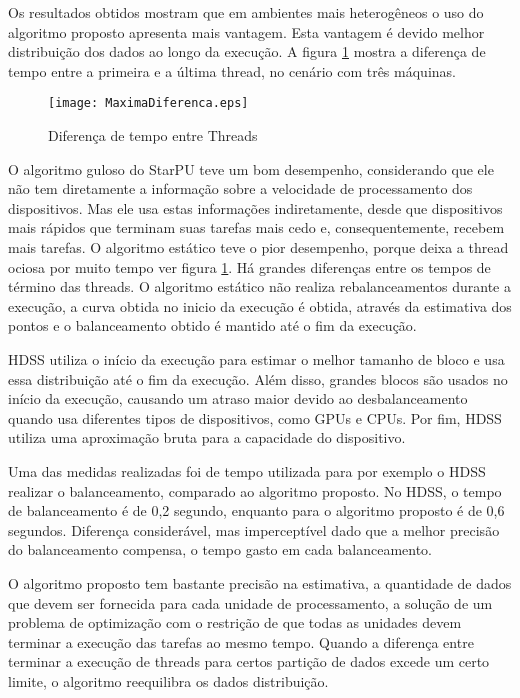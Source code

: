Os resultados obtidos mostram que em ambientes mais heterogêneos o uso do algoritmo proposto apresenta mais vantagem. Esta vantagem é devido melhor distribuição dos dados ao longo da execução. A figura \ref{fig:diferencaThreads} mostra a diferença de tempo entre a primeira e a última thread, no cenário com três máquinas.

\begin{figure}[htb]
	\begin{center}
	\centering
			\texttt{[image: MaximaDiferenca.eps]}
	\caption{Diferença de tempo entre Threads}
	\label{fig:diferencaThreads}
	\end{center}
\end{figure}

O algoritmo guloso do StarPU teve um bom desempenho, considerando que ele não tem diretamente a informação sobre a velocidade de processamento dos dispositivos. Mas ele usa estas informações indiretamente, desde que dispositivos mais rápidos que terminam suas tarefas mais cedo e, consequentemente, recebem mais tarefas. O algoritmo estático teve o pior desempenho, porque deixa a thread ociosa por muito tempo ver figura \ref{fig:diferencaThreads}. Há grandes diferenças entre os tempos de término das threads. O algoritmo estático não realiza rebalanceamentos durante a execução, a curva obtida no inicio da execução é obtida, através da estimativa dos pontos e o balanceamento obtido é mantido até o fim da execução.


HDSS utiliza o início da execução para estimar o melhor tamanho de bloco e usa essa distribuição até o fim da execução. Além disso, grandes blocos são usados no início da execução, causando um atraso maior devido ao desbalanceamento quando usa diferentes tipos de dispositivos, como GPUs e CPUs. Por fim, HDSS utiliza uma aproximação bruta para a capacidade do dispositivo. 

Uma das medidas realizadas foi de tempo utilizada para por exemplo o HDSS realizar o balanceamento, comparado ao algoritmo proposto. No HDSS, o tempo de balanceamento é de 0,2 segundo, enquanto para o algoritmo proposto é de 0,6 segundos. Diferença considerável, mas imperceptível dado que a melhor precisão do balanceamento compensa, o tempo gasto em cada balanceamento.
 
O algoritmo proposto tem  bastante precisão na estimativa,  a quantidade de dados que devem ser fornecida para cada unidade de processamento, a solução de um problema de optimização com o restrição de que todas as unidades devem terminar a execução das tarefas ao mesmo 
tempo. Quando a diferença entre terminar a execução de threads para certos 
partição de dados excede um certo limite, o algoritmo reequilibra os dados 
distribuição.

